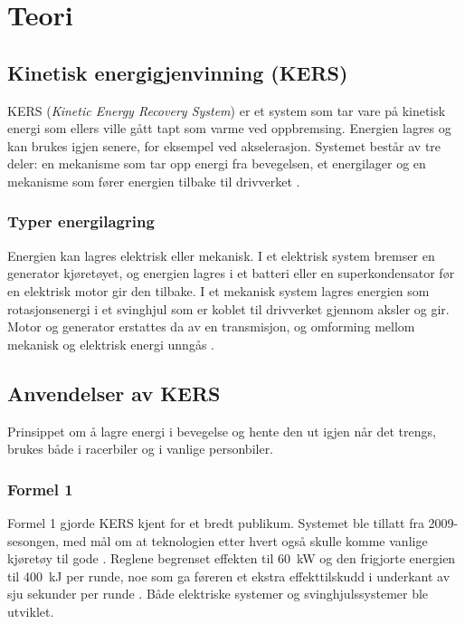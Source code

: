 \section{Teori}
\label{sec:teori}
\subsection{Kinetisk energigjenvinning (KERS)}
\label{sec:kers}
KERS (\emph{Kinetic Energy Recovery System}) er et system som tar vare på kinetisk energi som ellers ville gått tapt som varme ved oppbremsing. Energien lagres og kan brukes igjen senere, for eksempel ved akselerasjon. Systemet består av tre deler: en mekanisme som tar opp energi fra bevegelsen, et energilager og en mekanisme som fører energien tilbake til drivverket \parencite{batalha_kers}.

\subsubsection{Typer energilagring}
Energien kan lagres elektrisk eller mekanisk. I et elektrisk system bremser en generator kjøretøyet, og energien lagres i et batteri eller en superkondensator før en elektrisk motor gir den tilbake. I et mekanisk system lagres energien som rotasjonsenergi i et svinghjul som er koblet til drivverket gjennom aksler og gir. Motor og generator erstattes da av en transmisjon, og omforming mellom mekanisk og elektrisk energi unngås \parencite{batalha_kers}.

\subsection{Anvendelser av KERS}
\label{sec:kers-anvendelser}
Prinsippet om å lagre energi i bevegelse og hente den ut igjen når det trengs, brukes både i racerbiler og i vanlige personbiler.

\subsubsection{Formel 1}
Formel 1 gjorde KERS kjent for et bredt publikum. Systemet ble tillatt fra 2009-sesongen, med mål om at teknologien etter hvert også skulle komme vanlige kjøretøy til gode \parencite{batalha_kers}. Reglene begrenset effekten til \SI{60}{kW} og den frigjorte energien til \SI{400}{kJ} per runde, noe som ga føreren et ekstra effekttilskudd i underkant av sju sekunder per runde \parencite{f1technical_kers}. Både elektriske systemer og svinghjulssystemer ble utviklet.

